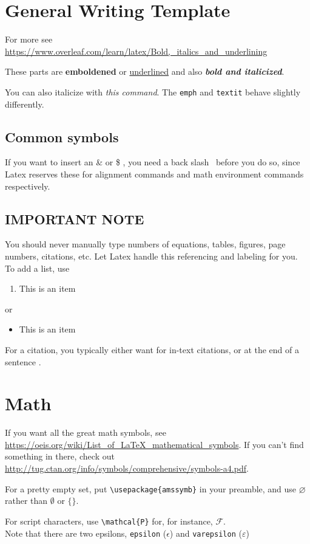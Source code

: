 \section{General Writing Template}\label{sec:general-writing}


For more see \url{https://www.overleaf.com/learn/latex/Bold,_italics_and_underlining}


These parts are \textbf{emboldened} 
or \underline{underlined} 
and also \textbf{\textit{bold and italicized}}.

You can also italicize with \emph{this command}. The \verb+emph+ and \verb+textit+ behave slightly differently.

\subsection{Common symbols}

If you want to insert an \& or \$ , you need a back slash \ before you do so, since Latex reserves these for alignment commands and math environment commands respectively.



\subsection{IMPORTANT NOTE}
You should never manually type numbers of equations, tables, figures, page numbers, citations, etc. Let Latex handle this referencing and labeling for you.\\

To add a list, use

\begin{enumerate}
    \item This is an item
\end{enumerate}

or 

\begin{itemize}
    \item This is an item
\end{itemize}

For a citation, you typically either want \citet{taylorBuffaloHuntInternational2011} for in-text citations, or at the end of a sentence \citep{taylorBuffaloHuntInternational2011}.


\section{Math}
If you want all the great math symbols, see \url{https://oeis.org/wiki/List_of_LaTeX_mathematical_symbols}. If you can't find something in there, check out \url{http://tug.ctan.org/info/symbols/comprehensive/symbols-a4.pdf}.

For a pretty empty set, put \verb+\usepackage{amssymb}+ in your preamble, and use $\varnothing$ rather than $\emptyset$ or $\{\}$.


For script characters, use \verb+\mathcal{P}+ for, for instance, $\mathcal{F}$. \\

Note that there are two epsilons, \verb+epsilon+ ($\epsilon$) and \verb+varepsilon+ ($\varepsilon$)
